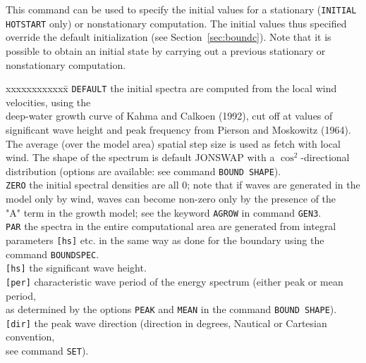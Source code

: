 \documentclass[12pt]{book}
\begin{document}
\noindent
This command can be used to specify the initial values for a stationary ({\tt INITIAL HOTSTART} only) or nonstationary computation.
The initial values thus specified override the default initialization (see Section~\ref{sec:boundc}). Note that it is possible to
obtain an initial state by carrying out a previous stationary or nonstationary computation.
\begin{tabbing}
xxxxxxxxxxxx\= \kill
{\tt DEFAULT}   \> the initial spectra are computed from the local wind velocities, using the\+\\
                   deep-water growth curve of Kahma and Calkoen (1992), cut off at values of\\
                   significant wave height and peak frequency from Pierson and Moskowitz (1964).\\
                   The average (over the model area) spatial step size is used as fetch with local\\
                   wind. The shape of the spectrum is default JONSWAP with a $\cos^2$-directional\\
                   distribution (options are available: see command {\tt BOUND SHAPE}).\-\\
{\tt ZERO}      \> the initial spectral densities are all 0; note that if waves are generated in the\+\\
                   model only by wind, waves can become non-zero only by the presence of the\\
                   "A" term in the growth model; see the keyword {\tt AGROW} in command {\tt GEN3}.\-\\
{\tt PAR}       \> the spectra in the entire computational area are generated from integral\+\\
                   parameters {\tt [hs]} etc. in the same way as done for the boundary using the\\
                   command {\tt BOUNDSPEC}.\-\\
{\tt [hs]}      \> the significant wave height.\\
{\tt [per]}     \> characteristic wave period of the energy spectrum (either peak or mean period,\+\\
                   as determined by the options {\tt PEAK} and {\tt MEAN} in the command {\tt BOUND SHAPE}).\-\\
{\tt [dir]}     \> the peak wave direction (direction in degrees, Nautical or Cartesian convention,\+\\
                   see command {\tt SET}).\-\\

\end{tabbing}
\end{document}
